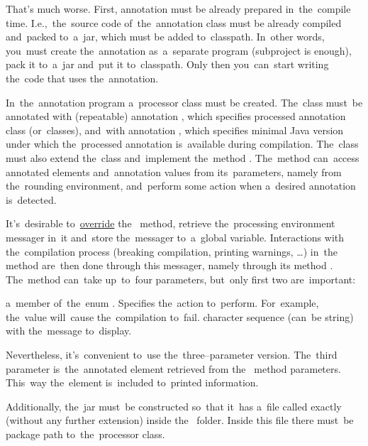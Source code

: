 That's much worse.
First, annotation must be already prepared in~the~compile time.
I.e.,~the~source code of~the~annotation class must be already compiled and~packed to~a~jar, which must be added to~classpath.
In~other words, you~must create the~annotation as~a~separate program (subproject is enough), pack it to~a~jar and~put it to~classpath.
Only then you~can~start writing the~code that uses the~annotation.

In~the~annotation program a~processor class must be created.
The~class must~be annotated with (repeatable) annotation , which specifies processed annotation class (or~classes), and~with annotation , which specifies minimal Java version under which the~processed annotation is~available during compilation.
The~class must also extend the~class  and~implement the~method .
The~method can~access annotated elements and~annotation values from its~parameters, namely from the~rounding environment, and~perform some action when a~desired annotation is~detected.

It's~desirable to~\hyperref[javaoverride]{override} the~ method, retrieve the~processing environment messager in~it and~store the~messager to~a~global variable.
Interactions with the~compilation process (breaking compilation, printing warnings, \dots) in~the~ method are~then done through this messager, namely through its method .
The~method can~take up~to~four parameters, but~only first two are~important:
\begin{itemize}
     a~member of~the~enum .
             Specifies the~action to~perform.
             For~example, the~value  will~cause the~compilation to~fail.
     character sequence (can~be string) with the~message to~display.
\end{itemize}
\noindent Nevertheless, it's~convenient to~use the~three--parameter version.
The~third parameter is~the~annotated element retrieved from the~ method parameters.
This~way the~element is~included to~printed information.

Additionally, the~jar must~be constructed so~that it~has a~file called exactly  (without any further extension) inside the~ folder.
Inside this file there must~be package path to~the~processor class.
\newpage

